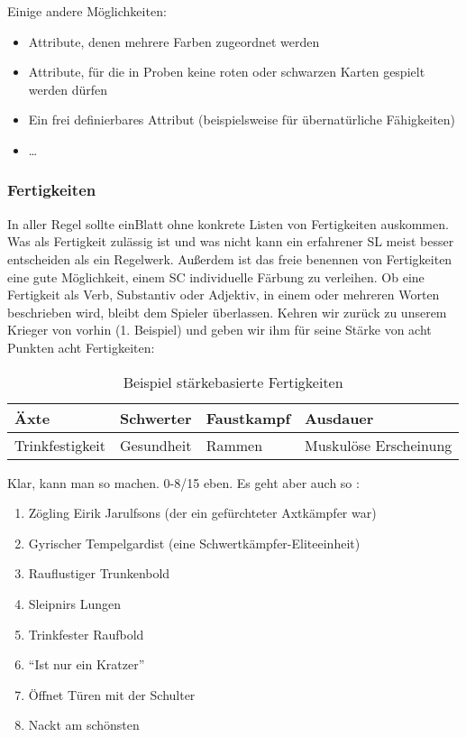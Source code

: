 Einige andere Möglichkeiten:
\begin {itemize}
\item Attribute, denen mehrere Farben zugeordnet werden
\item Attribute, für die in Proben keine roten oder schwarzen Karten gespielt werden dürfen
\item Ein frei definierbares Attribut (beispielsweise für übernatürliche Fähigkeiten)
\item \dots
\end {itemize}

\subsubsection {Fertigkeiten}
In aller Regel sollte einBlatt ohne konkrete Listen von Fertigkeiten auskommen. Was als Fertigkeit zulässig ist und was nicht kann ein erfahrener SL meist besser entscheiden als ein Regelwerk. Außerdem ist das freie benennen von Fertigkeiten eine gute Möglichkeit, einem SC individuelle Färbung zu verleihen. Ob eine Fertigkeit als Verb, Substantiv oder Adjektiv, in einem oder mehreren Worten beschrieben wird, bleibt dem Spieler überlassen.
Kehren wir zurück zu unserem Krieger von vorhin (1. Beispiel) und geben wir ihm für seine Stärke von acht Punkten acht Fertigkeiten:

\begin{table}[H]
\caption{Beispiel stärkebasierte Fertigkeiten}
\begin{tabular}{|l|l|l|l|}
\hline
Äxte & Schwerter & Faustkampf & Ausdauer\\
\hline
Trinkfestigkeit & Gesundheit & Rammen & Muskulöse Erscheinung\\
\hline
\end{tabular}
\end{table}

Klar, kann man so machen. 0-8/15 eben. Es geht aber auch so :

\begin {enumerate}
\item Zögling Eirik Jarulfsons (der ein gefürchteter Axtkämpfer war)
\item Gyrischer Tempelgardist (eine Schwertkämpfer-Eliteeinheit)
\item Rauflustiger Trunkenbold
\item Sleipnirs Lungen
\item Trinkfester Raufbold
\item "`Ist nur ein Kratzer"'
\item Öffnet Türen mit der Schulter
\item Nackt am schönsten
\end {enumerate}

